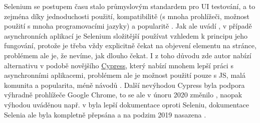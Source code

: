 Selenium se postupem času stalo průmyslovým standardem pro UI testování, a to zejména díky jednoduchosti použití, kompatibilitě (s mnoha prohlížeči, možnost použití s mnoha programovacími jazyky) a popularitě \cite{test-selenium1}. Jak ale uvádí \cite{test-cypress1}, v případě asynchronních aplikací je Selenium složitější používat vzhledem k principu jeho fungování, protože je třeba vždy explicitně čekat na objevení elementu na stránce, problémem ale je, že nevíme, jak dlouho čekat. I z toho důvodu zde autor nabízí alternativu v podobě novějšího \href{https://www.cypress.io/}{Cypress}, který nabízí mnohem lepší práci s asynchronními aplikacemi, problémem ale je možnost použití pouze s JS, malá komunita a popularita, méně návodů \cite{test-cypress1}. Další nevýhodou Cypress byla podpora výhradně prohlížeče Google Chrome, to se ale v únoru 2020 změnilo \cite{test-cypress2}, naopak výhodou uváděnou např. v \cite{test-cypress3} byla lepší dokumentace oproti Seleniu, dokumentace Selenia ale byla kompletně přepsána a na podzim 2019 nasazena \cite{test-selenium2}.

